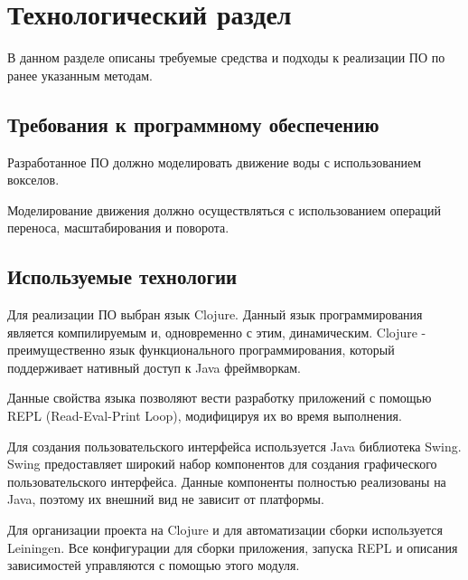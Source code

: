 \chapter{Технологический раздел}
\label{cha:impl}

В данном разделе описаны требуемые средства и подходы к реализации ПО по ранее указанным методам.


\section{Требования к программному обеспечению}

Разработанное ПО должно моделировать движение воды с использованием вокселов.
%

Моделирование движения должно осуществляться с использованием операций переноса, масштабирования и поворота.

\section{Используемые технологии}

Для реализации ПО выбран язык Clojure. Данный язык программирования является
компилируемым и, одновременно с этим, динамическим. Clojure - преимущественно
язык функционального программирования, который поддерживает нативный доступ к
Java фреймворкам.

Данные свойства языка позволяют вести разработку приложений с помощью REPL
(Read-Eval-Print Loop), модифицируя их во время выполнения.

Для создания пользовательского интерфейса используется Java библиотека Swing.
Swing предоставляет широкий набор компонентов для создания графического пользовательского
интерфейса. Данные компоненты полностью реализованы на Java, поэтому их внешний вид не зависит
от платформы.

Для организации проекта на Clojure и для автоматизации сборки используется Leiningen.
Все конфигурации для сборки приложения, запуска REPL и описания зависимостей управляются с помощью
этого модуля.

